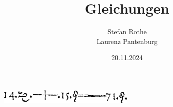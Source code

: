 \documentclass[parskip=half]{scrartcl}
\title{Gleichungen}
\author{Stefan Rothe\\
Laurenz Pantenburg}
\date{20.11.2024}
\begin{document}
  \maketitle
  \thispagestyle{firstpage}
  \begin{center}
    \vspace{5mm}

    \includegraphics[width=0.5\textwidth]{Erste Gleichung.png}
  \end{center}
  \tableofcontents
  \clearpage

  
  
  
  
  
\end{document}
